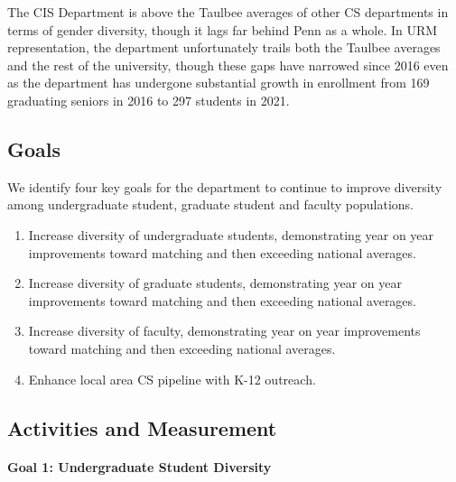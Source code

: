 The CIS Department is above the Taulbee averages of other CS departments in terms of gender diversity, though it lags far behind Penn as a whole. In URM representation, the department unfortunately trails both the Taulbee averages and the rest of the university, though these gaps have narrowed since 2016 even as the department has undergone substantial growth in enrollment from 169 graduating seniors in 2016 to 297 students in 2021.

\subsection*{Goals}

We identify four key goals for the department to continue to improve diversity among undergraduate student, graduate student and faculty populations.
\begin{enumerate}
\item
Increase diversity of undergraduate students, demonstrating year on year improvements toward matching and then exceeding national averages.
\item
Increase diversity of graduate students, demonstrating year on year improvements toward matching and then exceeding national averages.
\item
Increase diversity of faculty, demonstrating year on year improvements toward matching and then exceeding national averages.
\item
Enhance local area CS pipeline with K-12 outreach.
\end{enumerate}

\subsection*{Activities and Measurement}

\paragraph*{Goal 1: Undergraduate Student Diversity}

